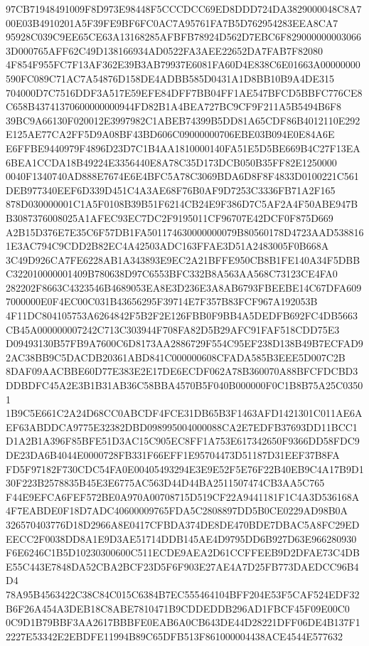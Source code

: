 \documentclass[UTF8,fontset=fandol,zihao=-4,a4paper]{ctexart}
\begin{document}
{{97CB71948491009F8D973E98448F5CCCDCC69ED8DDD724DA3829000048C8A700E03B4910201A5F39FE9BF6FC0AC7A95761FA7B5D762954283EEA8CA7
95928C039C9EE65CE63A13168285AFBFB78924D562D7EBC6F8290000000030663D000765AFF62C49D138166934AD0522FA3AEE22652DA7FAB7F82080
4F854F955FC7F13AF362E39B3AB79937E6081FA60D4E838C6E01663A00000000590FC089C71AC7A54876D158DE4ADBB585D0431A1D8BB10B9A4DE315
704000D7C7516DDF3A517E59EFE84DFF7BB04FF1AE547BFCD5BBFC776CE8C658B43741370600000000944FD82B1A4BEA727BC9CF9F211A5B5494B6F8
39BC9A66130F020012E3997982C1ABEB74399B5DD81A65CDF86B4012110E292E125AE77CA2FF5D9A08BF43BD606C09000000706EBE03B094E0E84A6E
E6FFBE9440979F4896D23D7C1B4AA1810000140FA51E5D5BE669B4C27F13EA6BEA1CCDA18B49224E3356440E8A78C35D173DCB050B35FF82E1250000
0040F1340740AD888E7674E6E4BFC5A78C3069BDA6D8F8F4833D0100221C561DEB977340EEF6D339D451C4A3AE68F76B0AF9D7253C3336FB71A2F165
878D030000001C1A5F0108B39B51F6214CB24E9F386D7C5AF2A4F50ABE947BB3087376008025A1AFEC93EC7DC2F9195011CF96707E42DCF0F875D669
A2B15D376E7E35C6F57DB1FA501174630000000079B80560178D4723AAD5388161E3AC794C9CDD2B82EC4A42503ADC163FFAE3D51A2483005F0B668A
3C49D926CA7FE6228AB1A343893E9EC2A21BFFE950CB8B1FE140A34F5DBBC322010000001409B780638D97C6553BFC332B8A563AA568C73123CE4FA0
282202F8663C4323546B4689053EA8E3D236E3A8AB6793FBEEBE14C67DFA6097000000E0F4EC00C031B43656295F39714E7F357B83FCF967A192053B
4F11DC804105753A6264842F5B2F2E126FBB0F9BB4A5DEDFB692FC4DB5663CB45A000000007242C713C303944F708FA82D5B29AFC91FAF518CDD75E3
D09493130B57FB9A7600C6D8173AA2886729F554C95EF238D138B49B7ECFAD92AC38BB9C5DACDB20361ABD841C000000608CFADA585B3EEE5D007C2B
8DAF09AACBBE60D77E383E2E17DE6ECDF062A78B360070A88BFCFDCBD3DDBDFC45A2E3B1B31AB36C58BBA4570B5F040B000000F0C1B8B75A25C03501
1B9C5E661C2A24D68CC0ABCDF4FCE31DB65B3F1463AFD1421301C011AE6AEF63ABDDCA9775E32382DBD098995004000088CA2E7EDFB37693DD11BCC1
D1A2B1A396F85BFE51D3AC15C905EC8FF1A753E617342650F9366DD58FDC9DE23DA6B4044E0000728FB331F66EFF1E95704473D51187D31EEF37B8FA
FD5F97182F730CDC54FA0E00405493294E3E9E52F5E76F22B40EB9C4A17B9D130F223B2578835B45E3E6775AC563D44D44BA2511507474CB3AA5C765
F44E9EFCA6FEF572BE0A970A00708715D519CF22A9441181F1C4A3D536168A4F7EABDE0F18D7ADC40600009765FDA5C2808897DD5B0CE0229AD98B0A
326570403776D18D2966A8E0417CFBDA374DE8DE470BDE7DBAC5A8FC29EDEECC2F0038DD8A1E9D3AE51714DDB145AE4D9795DD6B927D63E966280930
F6E6246C1B5D10230300600C511ECDE9AEA2D61CCFFEEB9D2DFAE73C4DBE55C443E7848DA52CBA2BCF23D5F6F903E27AE4A7D25FB773DAEDCC96B4D4
78A95B4563422C38C84C015C6384B7EC555464104BFF204E53F5CAF524EDF32B6F26A454A3DEB18C8ABE7810471B9CDDEDDB296AD1FBCF45F09E00C0
0C9D1B79BBF3AA2617BBBFE0EAB6A0CB643DE44D28221DFF06DE4B137F12227E53342E2EBDFE11994B89C65DFB513F861000004438ACE4544E577632
}}
\end{document}
